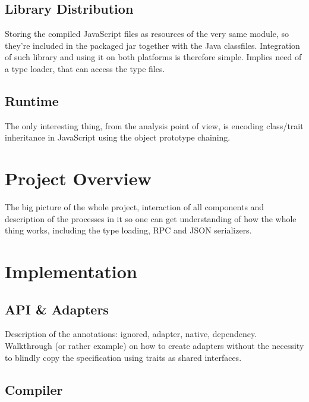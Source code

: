 \documentclass[12pt,a4paper]{report}
\begin{document}
\section{Library Distribution}

Storing the compiled JavaScript files as resources of the very same module, so they're included in the packaged jar together with the Java classfiles. Integration of such library and using it on both platforms is therefore simple. Implies need of a type loader, that can access the type files.

\section{Runtime}

The only interesting thing, from the analysis point of view, is encoding class/trait inheritance in JavaScript using the object prototype chaining.



\chapter{Project Overview}

The big picture of the whole project, interaction of all components and description of the processes in it so one can get understanding of how the whole thing works, including the type loading, RPC and JSON serializers.




\chapter{Implementation}

\section{API \& Adapters}

Description of the annotations: ignored, adapter, native, dependency. Walkthrough (or rather example) on how to create adapters without the necessity to blindly copy the specification using traits as shared interfaces.

\section{Compiler}
\end{document}
